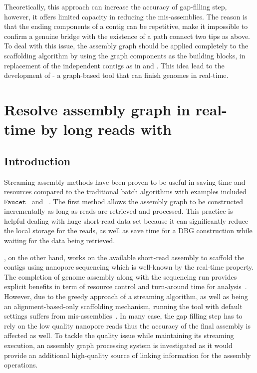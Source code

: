 Theoretically, this approach can increase the accuracy of gap-filling step, however, it offers limited capacity in reducing the mis-assemblies. The reason is that the ending components of a contig can be repetitive, make it impossible to confirm a genuine bridge with the existence of a path connect two tips as above. 
To deal with this issue, the assembly graph should be applied completely to the scaffolding algorithm by using the graph components as the building blocks, in replacement of the independent contigs as in \npscarf{} and \npscarfg{}. This idea lead to the development of \npgraph{} - a graph-based tool that can finish genomes in real-time.
\section{Resolve assembly graph in real-time by long reads with \npgraph{}}
\subsection{Introduction}
Streaming assembly methods have been proven to be useful in saving time and resources compared to the traditional batch algorithms with examples included \EG $\mathtt{Faucet}$~\cite{Rozov2017faucet} and \npscarf{}~\cite{Cao2017scaffolding}. The first method allows the assembly graph to be constructed incrementally as long as reads are retrieved and processed. This practice is helpful dealing with huge short-read data set because it can significantly reduce the local storage for the reads, as well as save time for a DBG construction while waiting for the data being retrieved.

\npscarf{}, on the other hand, works on the available short-read assembly to scaffold the contigs using nanopore sequencing which is well-known by the real-time property. The completion of genome assembly along with the sequencing run provides explicit benefits in term of resource control and turn-around time for analysis~\cite{Cao2017scaffolding}.  
However, due to the greedy approach of a streaming algorithm, as well as being an alignment-based-only scaffolding mechanism, running the tool with default settings suffers from mis-assemblies~\cite{Wick2017unicycler,Giordano2017}. In many case, the gap filling step has to rely on the low quality nanopore reads thus the accuracy of the final assembly is affected as well. 
To tackle the quality issue while maintaining its streaming execution, an assembly graph processing system is investigated as it would provide an additional high-quality source of linking information for the assembly operations. 

